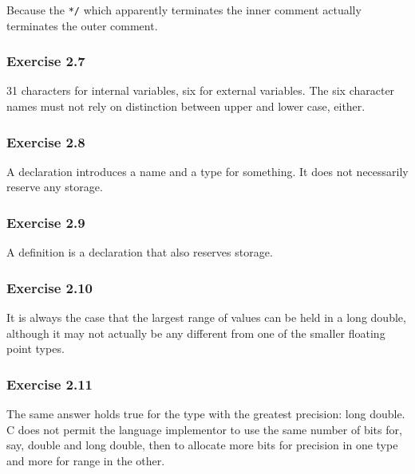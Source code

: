    Because the \texttt{*/} which apparently terminates the inner comment
    actually terminates the outer comment.


  

  \subsubsection*{Exercise 2.7}

   31 characters for internal variables, six for external variables. The six
    character names must not rely on distinction between upper and lower case,
    either.


  

  \subsubsection*{Exercise 2.8}

   A declaration introduces a name and a type for something. It does not
    necessarily reserve any storage.


  

  \subsubsection*{Exercise 2.9}

   A definition is a declaration that also reserves storage.


  

  \subsubsection*{Exercise 2.10}

   It is always the case that the largest range of values can be held in
    a long double, although it may not actually be any different from one of
    the smaller floating point types.


  

  \subsubsection*{Exercise 2.11}

   The same answer holds true for the type with the greatest precision: long
    double. C does not permit the language implementor to use the same number
    of bits for, say, double and long double, then to allocate more bits for
    precision in one type and more for range in the other.


